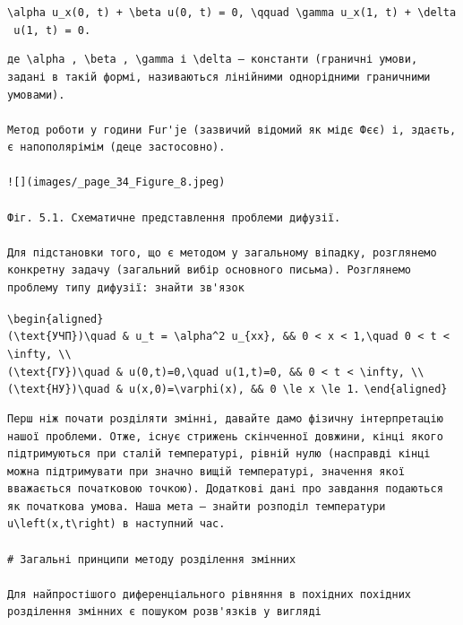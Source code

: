 \documentclass[
  ukrainian,
]{article}
\begin{document}
\texttt{\textbackslash{}alpha\ u\_x(0,\ t)\ +\ \textbackslash{}beta\ u(0,\ t)\ =\ 0,\ \textbackslash{}qquad\ \textbackslash{}gamma\ u\_x(1,\ t)\ +\ \textbackslash{}delta\ u(1,\ t)\ =\ 0.}

\begin{verbatim}
де \alpha , \beta , \gamma і \delta — константи (граничні умови, задані в такій формі, називаються лінійними однорідними граничними умовами).

Метод роботи у години Fur'je (зазвичий відомий як мідє Фєє) і, здаєть, є напополярімім (деце застосовно).

![](images/_page_34_Figure_8.jpeg)

Фіг. 5.1. Схематичне представлення проблеми дифузії.

Для підстановки того, що є методом у загальному віпадку, розглянемо конкретну задачу (загальний вибір основного письма). Розглянемо проблему типу дифузії: знайти зв'язок
\end{verbatim}

\texttt{\textbackslash{}begin\{aligned\}}
\texttt{(\textbackslash{}text\{УЧП\})\textbackslash{}quad\ \&\ u\_t\ =\ \textbackslash{}alpha\^{}2\ u\_\{xx\},\ \&\&\ 0\ \textless{}\ x\ \textless{}\ 1,\textbackslash{}quad\ 0\ \textless{}\ t\ \textless{}\ \textbackslash{}infty,\ \textbackslash{}\textbackslash{}}
\texttt{(\textbackslash{}text\{ГУ\})\textbackslash{}quad\ \&\ u(0,t)=0,\textbackslash{}quad\ u(1,t)=0,\ \&\&\ 0\ \textless{}\ t\ \textless{}\ \textbackslash{}infty,\ \textbackslash{}\textbackslash{}}
\texttt{(\textbackslash{}text\{НУ\})\textbackslash{}quad\ \&\ u(x,0)=\textbackslash{}varphi(x),\ \&\&\ 0\ \textbackslash{}le\ x\ \textbackslash{}le\ 1.}
\texttt{\textbackslash{}end\{aligned\}}

\begin{verbatim}
Перш ніж почати розділяти змінні, давайте дамо фізичну інтерпретацію нашої проблеми. Отже, існує стрижень скінченної довжини, кінці якого підтримуються при сталій температурі, рівній нулю (насправді кінці можна підтримувати при значно вищій температурі, значення якої вважається початковою точкою). Додаткові дані про завдання подаються як початкова умова. Наша мета — знайти розподіл температури u\left(x,t\right) в наступний час.

# Загальні принципи методу розділення змінних

Для найпростішого диференціального рівняння в похідних похідних розділення змінних є пошуком розв'язків у вигляді
\end{verbatim}
\end{document}
